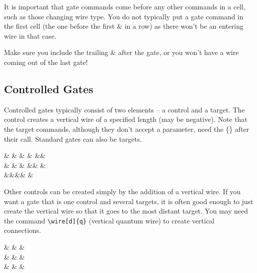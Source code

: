 \documentclass[aps,pra,10pt,nofootinbib]{revtex4-2}
\begin{document}
It is important that gate commands come before any other commands in a cell, such as those changing wire type. You do not typically put a gate command in the first cell (the one before the first \& in a row) as there won't be an entering wire in that case.

Make sure you include the trailing \& after the gate, or you won't have a wire coming out of the last gate!

\subsection{Controlled Gates}

Controlled gates typically consist of two elements -- a control and a target. The control creates a vertical wire of a specified length (may be negative). Note that the target commands, although they don't accept a parameter, need the \{\} after their call. Standard gates can also be targets.
\begin{Code}
  \begin{quantikz}
    &  & \targ{} &  &  &&\\
    & \control{} &  & \targX{} &&  &\\
    &&&&  & \meter{} 
  \end{quantikz}
\end{Code}
Other controls can be created simply by the addition of a vertical wire.
If you want a gate that is one control and several targets, it is often good enough to just create the vertical wire so that it goes to the most distant target. You may need the command \verb!\wire[d]{q}! (vertical quantum wire) to create vertical connections.

\begin{Code}
  \begin{quantikz}
    &  &  & \\
    & \targ{} &  & \\
    & \targ{} &  &
  \end{quantikz}
\end{Code}
\end{document}
